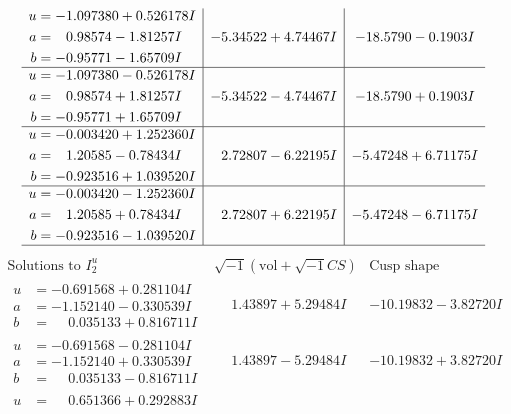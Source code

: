 \documentclass[1p]{elsarticle_modified}
\theoremstyle{definition}
\newcommand{\I}{\sqrt{-1}}
\begin{document}
$$\begin{array}{c|c|c}
\begin{aligned}
u &= -1.097380 + 0.526178 I \\
a &= \phantom{-}0.98574 - 1.81257 I \\
b &= -0.95771 - 1.65709 I\end{aligned}
 & -5.34522 + 4.74467 I & -18.5790 - 0.1903 I \\ \hline\begin{aligned}
u &= -1.097380 - 0.526178 I \\
a &= \phantom{-}0.98574 + 1.81257 I \\
b &= -0.95771 + 1.65709 I\end{aligned}
 & -5.34522 - 4.74467 I & -18.5790 + 0.1903 I \\ \hline\begin{aligned}
u &= -0.003420 + 1.252360 I \\
a &= \phantom{-}1.20585 - 0.78434 I \\
b &= -0.923516 + 1.039520 I\end{aligned}
 & \phantom{-}2.72807 - 6.22195 I & -5.47248 + 6.71175 I \\ \hline\begin{aligned}
u &= -0.003420 - 1.252360 I \\
a &= \phantom{-}1.20585 + 0.78434 I \\
b &= -0.923516 - 1.039520 I\end{aligned}
 & \phantom{-}2.72807 + 6.22195 I & -5.47248 - 6.71175 I\\
 \hline 
 \end{array}$$\newpage$$\begin{array}{c|c|c}  
\text{Solutions to }I^u_{2}& \I (\text{vol} + \sqrt{-1}CS) & \text{Cusp shape}\\
 \hline 
\begin{aligned}
u &= -0.691568 + 0.281104 I \\
a &= -1.152140 - 0.330539 I \\
b &= \phantom{-}0.035133 + 0.816711 I\end{aligned}
 & \phantom{-}1.43897 + 5.29484 I & -10.19832 - 3.82720 I \\ \hline\begin{aligned}
u &= -0.691568 - 0.281104 I \\
a &= -1.152140 + 0.330539 I \\
b &= \phantom{-}0.035133 - 0.816711 I\end{aligned}
 & \phantom{-}1.43897 - 5.29484 I & -10.19832 + 3.82720 I \\ \hline\begin{aligned}
u &= \phantom{-}0.651366 + 0.292883 I \\

\end{aligned}
\end{array}$$
\end{document}
